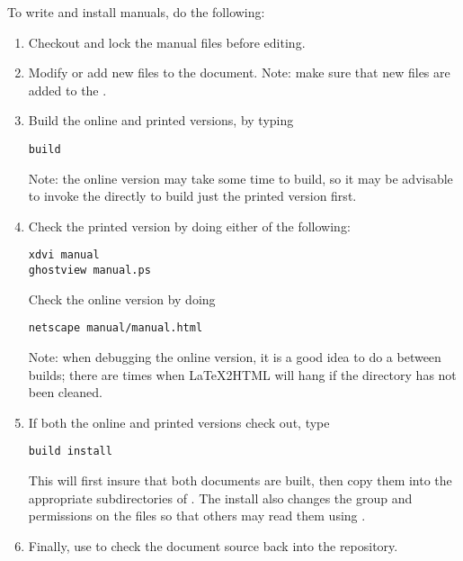 To write and install \parflow{} manuals, do the following:
\begin{enumerate}

\item
Checkout and lock the manual files before editing.

\item
Modify or add new  files to the document.
Note: make sure that new files are added to the
.

\item
Build the online and printed versions, by typing
\begin{display}\begin{verbatim}
build
\end{verbatim}\end{display}
Note: the online version may take some time to build, so it may
be advisable to invoke the  directly to build
just the printed version first.

\item
Check the printed version by doing either of the following:
\begin{display}\begin{verbatim}
xdvi manual
ghostview manual.ps
\end{verbatim}\end{display}
Check the online version by doing
\begin{display}\begin{verbatim}
netscape manual/manual.html
\end{verbatim}\end{display}
Note: when debugging the online version, it is a good idea to do a
 between builds; there are times when 
LaTeX2HTML will hang if the directory has not been cleaned.

\item
If both the online and printed versions check out, type
\begin{display}\begin{verbatim}
build install
\end{verbatim}\end{display}
This will first insure that both documents are built, then copy them
into the appropriate subdirectories of .
The install also changes the group and permissions on the files so
that others may read them using .

\item
Finally, use  to check the document source back
into the repository.

\end{enumerate}

